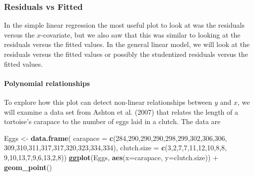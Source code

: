 \documentclass[]{book}
\newenvironment{Shaded}{\begin{snugshade}}{\end{snugshade}}
\newcommand{\KeywordTok}[1]{\textcolor[rgb]{0.13,0.29,0.53}{\textbf{{#1}}}}
\newcommand{\DataTypeTok}[1]{\textcolor[rgb]{0.13,0.29,0.53}{{#1}}}
\newcommand{\DecValTok}[1]{\textcolor[rgb]{0.00,0.00,0.81}{{#1}}}
\newcommand{\StringTok}[1]{\textcolor[rgb]{0.31,0.60,0.02}{{#1}}}
\newcommand{\NormalTok}[1]{{#1}}
\let\oldparagraph\paragraph
\renewcommand{\paragraph}[1]{\oldparagraph{#1}\mbox{}}
\theoremstyle{definition}
\theoremstyle{definition}
\theoremstyle{remark}
\begin{document}
\subsubsection{Residuals vs Fitted}\label{residuals-vs-fitted}

In the simple linear regression the most useful plot to look at was the
residuals versus the \(x\)-covariate, but we also saw that this was
similar to looking at the residuals versus the fitted values. In the
general linear model, we will look at the residuals versus the fitted
values or possibly the studentized residuals versus the fitted values.

\paragraph{Polynomial relationships}\label{polynomial-relationships}

To explore how this plot can detect non-linear relationships between
\(y\) and \(x\), we will examine a data set from Ashton et al. (2007)
that relates the length of a tortoise's carapace to the number of eggs
laid in a clutch. The data are

\begin{Shaded}
\begin{Highlighting}[]
\NormalTok{Eggs <-}\StringTok{ }\KeywordTok{data.frame}\NormalTok{(}
  \DataTypeTok{carapace    =} \KeywordTok{c}\NormalTok{(}\DecValTok{284}\NormalTok{,}\DecValTok{290}\NormalTok{,}\DecValTok{290}\NormalTok{,}\DecValTok{290}\NormalTok{,}\DecValTok{298}\NormalTok{,}\DecValTok{299}\NormalTok{,}\DecValTok{302}\NormalTok{,}\DecValTok{306}\NormalTok{,}\DecValTok{306}\NormalTok{,}
                  \DecValTok{309}\NormalTok{,}\DecValTok{310}\NormalTok{,}\DecValTok{311}\NormalTok{,}\DecValTok{317}\NormalTok{,}\DecValTok{317}\NormalTok{,}\DecValTok{320}\NormalTok{,}\DecValTok{323}\NormalTok{,}\DecValTok{334}\NormalTok{,}\DecValTok{334}\NormalTok{),}
  \DataTypeTok{clutch.size =} \KeywordTok{c}\NormalTok{(}\DecValTok{3}\NormalTok{,}\DecValTok{2}\NormalTok{,}\DecValTok{7}\NormalTok{,}\DecValTok{7}\NormalTok{,}\DecValTok{11}\NormalTok{,}\DecValTok{12}\NormalTok{,}\DecValTok{10}\NormalTok{,}\DecValTok{8}\NormalTok{,}\DecValTok{8}\NormalTok{,}
                  \DecValTok{9}\NormalTok{,}\DecValTok{10}\NormalTok{,}\DecValTok{13}\NormalTok{,}\DecValTok{7}\NormalTok{,}\DecValTok{9}\NormalTok{,}\DecValTok{6}\NormalTok{,}\DecValTok{13}\NormalTok{,}\DecValTok{2}\NormalTok{,}\DecValTok{8}\NormalTok{)) }
\KeywordTok{ggplot}\NormalTok{(Eggs, }\KeywordTok{aes}\NormalTok{(}\DataTypeTok{x=}\NormalTok{carapace, }\DataTypeTok{y=}\NormalTok{clutch.size)) +}\StringTok{ }
\StringTok{  }\KeywordTok{geom_point}\NormalTok{()}
\end{Highlighting}
\end{Shaded}
\end{document}
